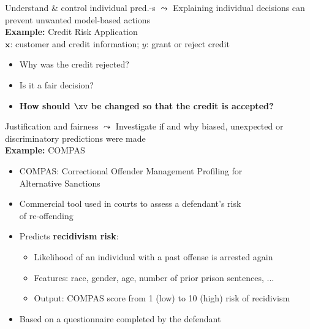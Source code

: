 \documentclass[10pt,compress,t,notes=noshow, xcolor=table]{beamer}
\begin{document}
\begin{frame}{Understand \& control individual pred.-s}
    $\leadsto$ Explaining individual decisions can prevent unwanted model-based actions  \\
    \medskip
    \textbf{Example:} Credit Risk Application\\
    $\textbf{x}$: customer and credit information; $y$: grant or reject credit
	
	\begin{itemize}
		\item Why was the credit rejected?
		\item Is it a fair decision?
		\item \textbf{How should $\xv$ be changed so that the credit is accepted?}
	\end{itemize}
	
\end{frame}


\begin{frame}{Justification and fairness}
    $\leadsto$ Investigate if and why biased, unexpected or discriminatory predictions were made \\
    \bigskip
    \textbf{Example:} COMPAS
    \smallskip
    \begin{itemize}
        \item COMPAS: Correctional Offender Management Profiling for\\ Alternative Sanctions
    \item Commercial tool used in courts to assess a defendant’s risk\\ of re-offending

    \item Predicts \textbf{recidivism risk}:
    \begin{itemize}
        \item Likelihood of an individual with a past offense is arrested again
        \item Features: race, gender, age, number of prior prison sentences, ...
        \item Output: COMPAS score from 1 (low) to 10 (high) risk of recidivism
    \end{itemize}
    \item Based on a questionnaire completed by the defendant
    \end{itemize}

\end{frame}
\end{document}

